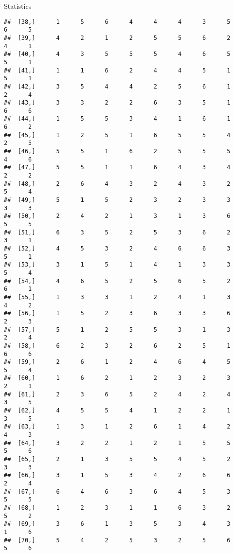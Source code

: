 \documentclass[
  ignorenonframetext,
]{beamer}
\begin{document}
\begin{frame}[fragile]{Statistics}
\begin{verbatim}
##  [38,]      1      5      6      4      4      4      3      5      6      5
##  [39,]      4      2      1      2      5      5      6      2      4      1
##  [40,]      4      3      5      5      5      4      6      5      5      1
##  [41,]      1      1      6      2      4      4      5      1      5      1
##  [42,]      3      5      4      4      2      5      6      1      2      4
##  [43,]      3      3      2      2      6      3      5      1      6      6
##  [44,]      1      5      5      3      4      1      6      1      6      2
##  [45,]      1      2      5      1      6      5      5      4      2      5
##  [46,]      5      5      1      6      2      5      5      5      4      6
##  [47,]      5      5      1      1      6      4      3      4      2      2
##  [48,]      2      6      4      3      2      4      3      2      5      4
##  [49,]      5      1      5      2      3      2      3      3      3      3
##  [50,]      2      4      2      1      3      1      3      6      5      5
##  [51,]      6      3      5      2      5      3      6      2      3      1
##  [52,]      4      5      3      2      4      6      6      3      5      1
##  [53,]      3      1      5      1      4      1      3      3      5      4
##  [54,]      4      6      5      2      5      6      5      2      6      1
##  [55,]      1      3      3      1      2      4      1      3      4      2
##  [56,]      1      5      2      3      6      3      3      6      2      3
##  [57,]      5      1      2      5      5      3      1      3      2      4
##  [58,]      6      2      3      2      6      2      5      1      6      6
##  [59,]      2      6      1      2      4      6      4      5      5      4
##  [60,]      1      6      2      1      2      3      2      3      2      1
##  [61,]      2      3      6      5      2      4      2      4      3      5
##  [62,]      4      5      5      4      1      2      2      1      3      5
##  [63,]      1      3      1      2      6      1      4      2      4      3
##  [64,]      3      2      2      1      2      1      5      5      5      6
##  [65,]      2      1      3      5      5      4      5      2      3      3
##  [66,]      3      1      5      3      4      2      6      6      2      4
##  [67,]      6      4      6      3      6      4      5      3      5      5
##  [68,]      1      2      3      1      1      6      3      2      5      2
##  [69,]      3      6      1      3      5      3      4      3      1      6
##  [70,]      5      4      2      5      3      2      5      6      5      6

\end{verbatim}
\end{frame}
\end{document}
